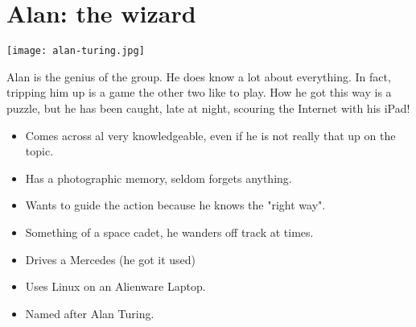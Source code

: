 \section{Alan: the wizard}

\texttt{[image: alan-turing.jpg]}

Alan is the genius of the group. He does know a lot about everything. In fact,
tripping him up is a game the other two like to play. How he got this way is a
puzzle, but he has been caught, late at night, scouring the Internet with his
iPad!

\begin{itemize}
	\item{Comes across al very knowledgeable, even if he is not really that up on the topic.}
    \item{Has a photographic memory, seldom forgets anything.}
    \item{Wants to guide the action because he knows the "right way".}
    \item{Something of a space cadet, he wanders off track at times.}
    \item{Drives a Mercedes (he got it used)}
    \item{Uses Linux on an Alienware Laptop.}
    \item{Named after Alan Turing.}
\end{itemize}
